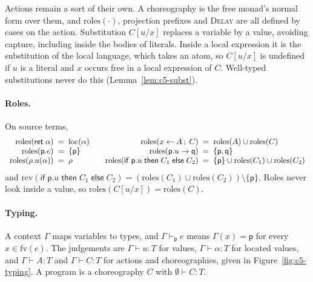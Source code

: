 \documentclass[11pt]{report}
\theoremstyle{plain}
\theoremstyle{definition}
\theoremstyle{remark}
\newcommand{\kw}[1]{\mathsf{#1}}
\newcommand{\pp}{\mathsf{p}}
\newcommand{\qq}{\mathsf{q}}
\newcommand{\fv}{\mathrm{fv}}
\newcommand{\bind}[3]{#1 \leftarrow #2\,;\;#3}
\newcommand{\cret}[1]{\kw{ret}\;#1}
\newcommand{\com}[3]{#1.#2 \to #3}
\newcommand{\cif}[4]{\kw{if}\;#1.#2\;\kw{then}\;#3\;\kw{else}\;#4}
\newcommand{\roles}[1]{\mathrm{roles}(#1)}
\newcommand{\rcv}[1]{\mathrm{rcv}(#1)}
\newcommand{\loc}[1]{\mathrm{loc}(#1)}
\newcommand{\rn}[1]{{\normalfont\scshape #1}}
\begin{document}
Actions remain a sort of their own.  A choreography is the free monad's
normal form over them, and $\roles{\cdot}$, projection prefixes and
\rn{Delay} are all defined by cases on the action.  Substitution $C[u/x]$
replaces a variable by a value, avoiding capture, including inside the
bodies of literals.  Inside a local expression it is the substitution of the
local language, which takes an atom, so $C[u/x]$ is undefined if $u$ is a
literal and $x$ occurs free in a local expression of $C$.  Well-typed
substitutions never do this (Lemma~\ref{lem:c5-subst}).

\paragraph{Roles.}
On source terms,
\[
\begin{array}{r@{\;\;=\;\;}l@{\qquad}r@{\;\;=\;\;}l}
  \roles{\cret{\alpha}} & \loc{\alpha} &
  \roles{\bind{x}{A}{C}} & \roles{A}\cup\roles{C}\\
  \roles{\pp.e} & \{\pp\} &
  \roles{\com{\pp}{u}{\qq}} & \{\pp,\qq\}\\
  \roles{\rho.u(\alpha)} & \rho &
  \roles{\cif{\pp}{u}{C_1}{C_2}} & \{\pp\}\cup\roles{C_1}\cup\roles{C_2}
\end{array}
\]
and $\rcv{\cif{\pp}{u}{C_1}{C_2}}=(\roles{C_1}\cup\roles{C_2})\setminus\{\pp\}$.
Roles never look inside a value, so $\roles{C[u/x]}=\roles{C}$.

\paragraph{Typing.}
A context $\Gamma$ maps variables to types, and $\Gamma\vdash_\pp e$ means
$\Gamma(x)=\pp$ for every $x\in\fv(e)$.  The judgements are $\Gamma\vdash
u:T$ for values, $\Gamma\vdash\alpha:T$ for located values, and $\Gamma\vdash
A:T$ and $\Gamma\vdash C:T$ for actions and choreographies, given in
Figure~\ref{fig:c5-typing}.  A program is a choreography $C$ with
$\emptyset\vdash C:T$.
\end{document}
